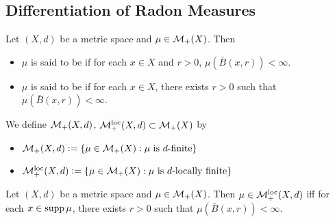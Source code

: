 \documentclass{book}
\begin{document}
	
	
	
	
	
	
	
	
	
	
	
	
	
	
	
	
	
	
	
	
	
	
	
	
	
	
	
	
	
	\subsection{Differentiation of Radon Measures}

	\begin{defn} 
		Let $(X, d)$ be a metric space and $\mu \in \mathcal{M}_+(X)$. Then
		\begin{itemize}
			\item $\mu$ is said to be  if for each $x \in X$ and $r > 0$, $\mu(\bar{B}(x, r)) < \infty$. 
			\item  $\mu$ is said to be  if for each $x \in X$, there exists $r > 0$ such that $\mu(\bar{B}(x, r)) < \infty$. 
		\end{itemize}
		We define $\mathcal{M}_+(X, d)$, $\mathcal{M}_+^{\text{loc}}(X, d) \subset \mathcal{M}_+(X)$ by
		\begin{itemize} 
			\item $\mathcal{M}_+(X, d) \vcentcolon= \{\mu \in \mathcal{M}_+(X): \mu \text{ is $d$-finite}\}$
			\item $\mathcal{M}_+^{\text{loc}}(X, d) \vcentcolon= \{\mu \in \mathcal{M}_+(X): \mu \text{ is $d$-locally finite}\}$
		\end{itemize}
	\end{defn}

	\begin{ex} 
		Let $(X, d)$ be a metric space and $\mu \in \mathcal{M}_+(X)$. Then $\mu \in \mathcal{M}_+^{\text{loc}}(X, d)$ iff for each $x \in \operatorname{supp} \mu$, there exists $r > 0$ such that $\mu(\bar{B}(x, r)) < \infty$. 
	\end{ex}
\end{document}
